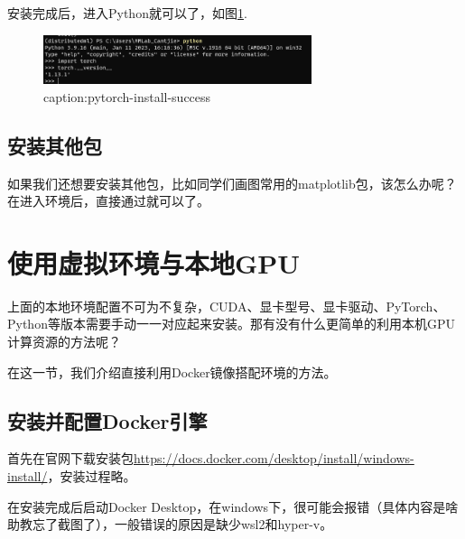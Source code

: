 安装完成后，进入Python就可以了，如图\ref{fig:pytorch-install-success}.

\begin{figure}[htbp]
	\centering
	\includegraphics[width=0.7\textwidth]{figures/pytorch-install-success.png}
	\caption{caption:pytorch-install-success}
	\label{fig:pytorch-install-success}
\end{figure}

\subsection{安装其他包}

如果我们还想要安装其他包，比如同学们画图常用的matplotlib包，该怎么办呢？在进入环境后，直接通过就可以了。




\section{使用虚拟环境与本地GPU}

上面的本地环境配置不可为不复杂，CUDA、显卡型号、显卡驱动、PyTorch、Python等版本需要手动一一对应起来安装。那有没有什么更简单的利用本机GPU计算资源的方法呢？

在这一节，我们介绍直接利用Docker镜像搭配环境的方法。

\subsection{安装并配置Docker引擎}

首先在官网下载安装包\url{https://docs.docker.com/desktop/install/windows-install/}，安装过程略。

在安装完成后启动Docker Desktop，在windows下，很可能会报错（具体内容是啥助教忘了截图了），一般错误的原因是缺少wsl2和hyper-v。

